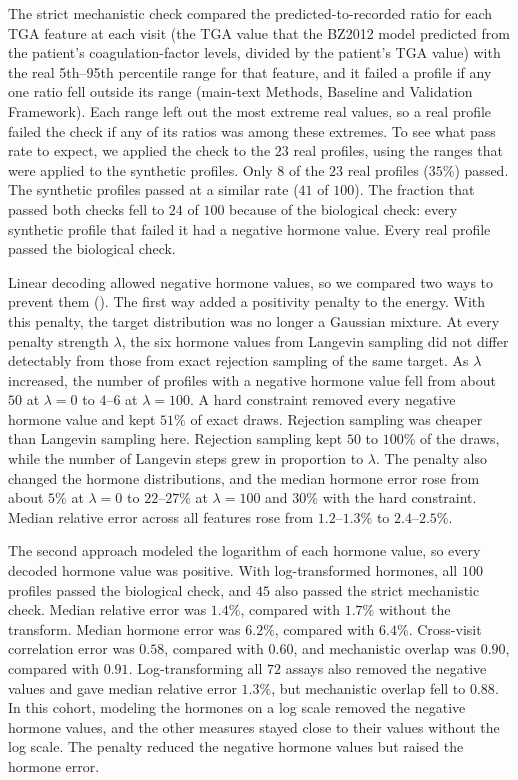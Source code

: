 The strict mechanistic check compared the predicted-to-recorded ratio for each TGA
feature at each visit (the TGA value that the BZ2012 model
predicted from the patient's coagulation-factor levels, divided by the patient's TGA value) with the real 5th--95th percentile range for that feature, and it failed
a profile if any one ratio fell outside its range (main-text Methods, Baseline and Validation
Framework). Each range left out the most extreme real values, so a real profile failed the
check if any of its ratios was among these extremes. To see what pass rate to expect, we
applied the check to the $23$ real profiles, using the ranges that were applied to the
synthetic profiles. Only $8$ of the $23$ real profiles
($35\%$) passed. The synthetic profiles passed at a similar rate ($41$ of $100$). The fraction
that passed both checks fell to $24$ of $100$ because of the biological check: every synthetic
profile that failed it had a negative hormone value. Every real profile passed the biological
check.

Linear decoding allowed negative hormone values, so we compared two ways to prevent
them (). The first way added a positivity penalty to the energy.
With this penalty, the target distribution was no longer a Gaussian mixture. At every penalty
strength $\lambda$, the six hormone values from Langevin sampling did not differ detectably
from those from exact rejection sampling of the same target. As $\lambda$ increased, the number of profiles with a negative hormone value fell
from about $50$ at $\lambda=0$ to $4$--$6$ at $\lambda=100$. A hard constraint removed every
negative hormone value and kept $51\%$ of exact draws. Rejection sampling was cheaper than Langevin
sampling here. Rejection sampling kept $50$ to $100\%$ of the draws, while the number of
Langevin steps grew in proportion to $\lambda$. The penalty also changed the hormone
distributions, and the median hormone error rose from about $5\%$ at $\lambda=0$ to $22$--$27\%$ at $\lambda=100$ and $30\%$ with the
hard constraint. Median relative error across all features rose from $1.2$--$1.3\%$ to
$2.4$--$2.5\%$.

The second approach modeled the logarithm of each hormone value, so every decoded
hormone value was positive. With log-transformed hormones, all $100$ profiles passed the
biological check, and $45$ also passed the strict mechanistic check. Median relative error was
$1.4\%$, compared with $1.7\%$ without the transform. Median hormone error was $6.2\%$, compared
with $6.4\%$. Cross-visit correlation error was $0.58$, compared with $0.60$, and mechanistic
overlap was $0.90$, compared with $0.91$.
Log-transforming all $72$ assays also removed the negative values and gave median relative
error $1.3\%$, but mechanistic overlap fell to $0.88$. In this cohort, modeling the hormones
on a log scale removed the negative hormone values, and the other measures stayed close to their values
without the log scale. The penalty reduced the negative hormone values but raised the hormone error.

